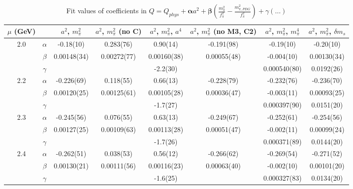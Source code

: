 \documentclass[12pt]{extarticle}
\begin{document}
\begin{table}[h!]
\begin{center}
\begin{tabular}{|c c|c|c|c|c|c|c|}
\hline
$\mu$ (GeV) &  & $a^2$, $m_\pi^2$& $a^2$, $m_\pi^2$ (no C)& $a^2$, $m_\pi^2$, $a^4$& $a^2$, $m_\pi^2$ (no M3, C2)& $a^2$, $m_\pi^2$, $m_\pi^4$& $a^2$, $m_\pi^2$, $\delta m_s$\\
\hline
\multirow{3}{0.5in}{2.0} & $\alpha$ & -0.18(10)& 0.283(76)& 0.90(14)& -0.191(98)& -0.19(10)& -0.20(10)\\
 & $\beta$ & 0.00148(34)& 0.00272(77)& 0.00160(38)& 0.00055(48)& -0.004(10)& 0.00130(34)\\
 & $\gamma$ &  &  & -2.2(30)&  & 0.000540(80)& 0.0192(26)\\
\hline
\multirow{3}{0.5in}{2.2} & $\alpha$ & -0.226(69)& 0.118(55)& 0.66(13)& -0.228(79)& -0.232(76)& -0.236(70)\\
 & $\beta$ & 0.00120(25)& 0.00125(61)& 0.00105(28)& 0.00036(47)& -0.003(11)& 0.00093(25)\\
 & $\gamma$ &  &  & -1.7(27)&  & 0.000397(90)& 0.0151(20)\\
\hline
\multirow{3}{0.5in}{2.3} & $\alpha$ & -0.245(56)& 0.076(55)& 0.63(13)& -0.249(67)& -0.252(61)& -0.254(56)\\
 & $\beta$ & 0.00127(25)& 0.00109(63)& 0.00113(28)& 0.00051(47)& -0.002(11)& 0.00099(24)\\
 & $\gamma$ &  &  & -1.7(26)&  & 0.000371(89)& 0.0144(20)\\
\hline
\multirow{3}{0.5in}{2.4} & $\alpha$ & -0.262(51)& 0.038(53)& 0.56(12)& -0.266(62)& -0.269(54)& -0.271(52)\\
 & $\beta$ & 0.00130(21)& 0.00111(56)& 0.00116(23)& 0.00063(40)& -0.002(10)& 0.00101(20)\\
 & $\gamma$ &  &  & -1.6(25)&  & 0.000327(83)& 0.0134(20)\\
\hline
\end{tabular}
\caption{Fit values of coefficients in $Q = Q_{phys} + \mathbf{\alpha} a^2 + \mathbf{\beta}\left(\frac{m_\pi^2}{f_\pi^2}-\frac{m_{\pi,PDG}^2}{f_\pi^2}\right) + \gamma(\ldots)$}
\end{center}
\end{table}






\end{document}
